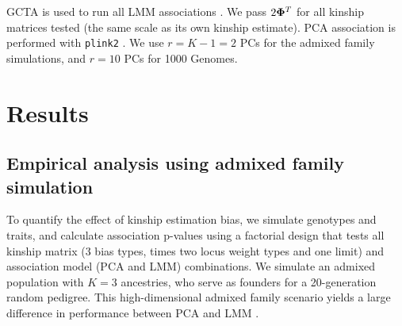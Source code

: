 \documentclass[11pt]{article}
\newcommand{\kinMat}[1][T]{%
  \ensuremath{%
    \mathbf{\Phi}^{#1}
  }%
  \xspace%
}%
\begin{document}
GCTA is used to run all LMM associations \citep{yang_gcta:_2011, yang_advantages_2014}.
We pass $2 \kinMat$ for all kinship matrices tested (the same scale as its own kinship estimate).
PCA association is performed with \texttt{plink2} \citep{chang_second-generation_2015}.
We use $r = K - 1 = 2$ PCs for the admixed family simulations, and $r = 10$ PCs for 1000 Genomes.

\section{Results}

\graphicspath{ {../data/} }

\subsection{Empirical analysis using admixed family simulation}

To quantify the effect of kinship estimation bias, we simulate genotypes and traits, and calculate association p-values using a factorial design that tests all kinship matrix (3 bias types, times two locus weight types and one limit) and association model (PCA and LMM) combinations.
We simulate an admixed population with $K=3$ ancestries, who serve as founders for a 20-generation random pedigree.
This high-dimensional admixed family scenario yields a large difference in performance between PCA and LMM \citep{yao_limitations_2022}.
\end{document}
